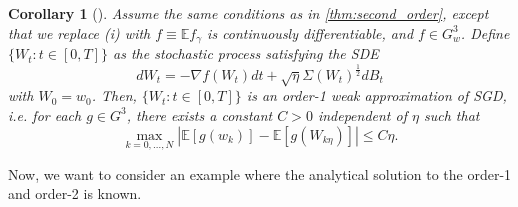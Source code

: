 \documentclass[12pt]{article}
\newtheorem{corollary}[theorem]{Corollary}
\theoremstyle{definition}
\numberwithin{equation}{section}
\newcommand{\E}{\mathbb{E}}
\newcommand{\ev}[1]{\mathbb{E}\left[{#1}\right]}
\begin{document}
\begin{corollary}[]
  \label{cor:first_order}
  Assume the same conditions as in \autoref{thm:second_order}, except that we replace (i) with $f \equiv \E f_{\gamma}$ is continuously differentiable, and $f \in G^3_w$.
  Define $\{W_t:t\in [0,T] \}$ as the stochastic process satisfying the SDE
  \begin{equation}
    \label{eq:first_order_sde}
    d W_t = -\nabla f(W_t) dt + \sqrt{\eta}\Sigma(W_t)^{\frac{1}{2}}dB_t
  \end{equation}
  with $W_0 = w_0$. Then, $\{W_t:t\in [0,T] \}$ is an order-1 weak approximation of SGD, i.e. for each $g \in G^3$, there exists a constant $C > 0$ independent of $\eta$ such that
  \begin{equation}
    \label{eq:first_order_convergence}
    \max_{k=0,\dots,N} |\ev{g(w_k)} - \ev{g(W_{k\eta})}| \leq C \eta.
  \end{equation}
\end{corollary}
Now, we want to consider an example where the analytical solution to the order-1 and order-2 is known.
\end{document}
